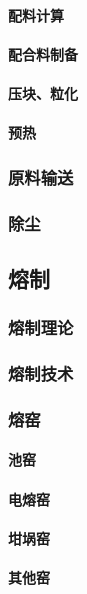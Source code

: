 \documentclass[UTF8]{../../ApplicationUniverse}
\begin{document}
            \paragraph{配料计算}
            \paragraph{配合料制备}
            \paragraph{压块、粒化}
            \paragraph{预热}
        \subsubsection{原料输送}
        \subsubsection{除尘}
    \subsection{熔制}
        \subsubsection{熔制理论}
        \subsubsection{熔制技术}
        \subsubsection{熔窑}
            \paragraph{池窑}
            \paragraph{电熔窑}
            \paragraph{坩埚窑}
            \paragraph{其他窑}
\end{document}
